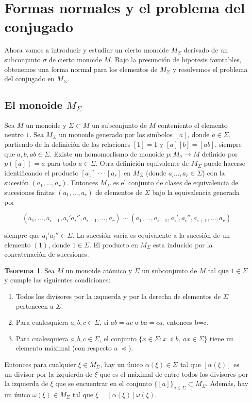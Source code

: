 \documentclass[12pt]{article}
\theoremstyle{definition}
\newtheorem{teor}{Teorema}[section]
\begin{document}
\section{Formas normales y el problema del conjugado}

Ahora vamos a introducir y estudiar un cierto monoide $M_\Sigma$ derivado de un subconjunto $\sigma$ de cierto monoide $M$. Bajo la presunción de hipotesis favorables, obtenemos una forma normal para los elementos de $M_\Sigma$ y resolvemos el problema del conjugado en $M_\Sigma$.

\subsection{El monoide $M_\Sigma$}

Sea $M$ un monoide y $\Sigma\subset M$ un subconjunto de $M$ conteniento el elemento neutro $1$. Sea $M_\Sigma$ un monoide generado por los simbolos $[a]$, donde $a\in \Sigma$, partiendo de la definición de las relaciones $[1]=1$ y $[a][b]=[ab]$, siempre que $a,b,ab\in\Sigma$. Existe un homomorfismo de monoide $p:M_\sigma\rightarrow M$ definido por $p([a])=a$ para todo $a\in\Sigma$.
\newline\newline
Otra definición equivalente de $M_\Sigma$ puede hacerse identificando el producto $[a_1]\cdot\cdot\cdot[a_r]$ en $M_\Sigma$ (donde $a_,...,a_r\in \Sigma$) con la sucesión $(a_1,...,a_r)$. Entonces $M_\Sigma$ es el conjunto de clases de equivalencia de sucesiones finitas $(a_1,...,a_r)$ de elementos de $\Sigma$ bajo la equivalencia generada por

$$(a_1,...,a_{i-1}, a_i'a_i'',a_{i+1},...,a_r)\sim (a_1,...,a_{i-1}, a_i',a_i'',a_{i+1},...,a_r)$$

siempre que $a_i'a_i''\in\Sigma$. La sucesión vacía es equivalente a la sucesión de un elemento $(1)$, donde $1\in\Sigma$. El producto en $M_\Sigma$ esta inducido por la concatenación de sucesiones.


\begin{teor}
\label{teor:monoi_deriv}
Sea $M$ un monoide atómico y $\Sigma$ un subconjunto de $M$ tal que $1\in \Sigma$ y cumple las siguientes condiciones:
\begin{enumerate}
\item Todos los divisores por la izquierda y por la derecha de elementos de $\Sigma$ pertenecen a $\Sigma$.
\item Para cualesquiera $a,b,c\in \Sigma$, si $ab=ac$ o $ba=ca$, entonces b=c.
\item Para cualesquiera $a,b,c\in \Sigma$, el conjunto $\{x\in\Sigma:x\preceq b,\ ax\in\Sigma\}$ tiene un elemento máximal (con respecto a $\preceq$).
\end{enumerate}
Entonces para cualquier $\xi\in M_\Sigma$, hay un único $\alpha(\xi)\in\Sigma$ tal que $[\alpha(\xi)]$ es un divisor por la izquierda de $\xi$ que es el máximal de entre todos los divisores por la izquierda de $\xi$ que se encuentrar en el conjunto $\{[a]\}_{a\in\Sigma}\subset M_\Sigma$. Además, hay un único $\omega(\xi)\in M_\Sigma$ tal que $\xi=[\alpha(\xi)]\omega(\xi)$.
\end{teor}
\end{document}
